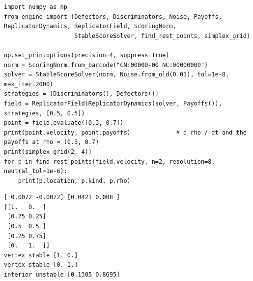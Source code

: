 \begin{lstlisting}[style=code]
import numpy as np
from engine import (Defectors, Discriminators, Noise, Payoffs, ReplicatorDynamics, ReplicatorField, ScoringNorm,
                    StableScoreSolver, find_rest_points, simplex_grid)

np.set_printoptions(precision=4, suppress=True)
norm = ScoringNorm.from_barcode("CN:00000-00 NC:00000000")
solver = StableScoreSolver(norm, Noise.from_old(0.01), tol=1e-8, max_iter=2000)
strategies = [Discriminators(), Defectors()]
field = ReplicatorField(ReplicatorDynamics(solver, Payoffs()), strategies, [0.5, 0.5])
point = field.evaluate([0.3, 0.7])
print(point.velocity, point.payoffs)             # d rho / dt and the payoffs at rho = (0.3, 0.7)
print(simplex_grid(2, 4))
for p in find_rest_points(field.velocity, n=2, resolution=8, neutral_tol=1e-6):
    print(p.location, p.kind, p.rho)
\end{lstlisting}
\begin{lstlisting}[style=output]
[ 0.0072 -0.0072] [0.0421 0.008 ]
[[1.   0.  ]
 [0.75 0.25]
 [0.5  0.5 ]
 [0.25 0.75]
 [0.   1.  ]]
vertex stable [1. 0.]
vertex stable [0. 1.]
interior unstable [0.1305 0.8695]
\end{lstlisting}
